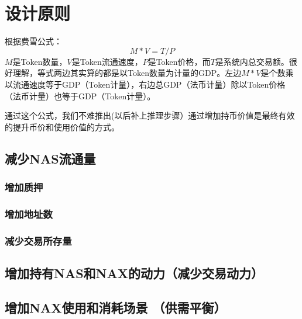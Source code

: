 \section{设计原则}

根据费雪公式：
\begin{equation}
M * V = T / P
\end{equation}
\(M\)是Token数量，\(V\)是Token流通速度，\(P\)是Token价格，而\(T\)是系统内总交易额。很好理解，等式两边其实算的都是以Token数量为计量的GDP。左边\(M * V\)是个数乘以流通速度等于GDP（Token计量），右边总GDP（法币计量）除以Token价格（法币计量）也等于GDP（Token计量）。

通过这个公式，我们不难推出(以后补上推理步骤）通过增加持币价值是最终有效的提升币价和使用价值的方式。

\subsection{减少NAS流通量}
\subsubsection{增加质押}
\subsubsection{增加地址数}
\subsubsection{减少交易所存量}
\subsection{增加持有NAS和NAX的动力（减少交易动力）}
\subsection{增加NAX使用和消耗场景 （供需平衡）}
